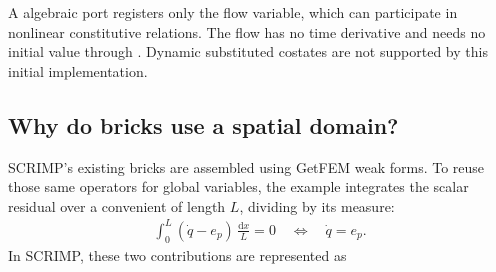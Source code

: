 \documentclass[letterpaper,10pt,english]{sphinxmanual}
\begin{document}
\begin{sphinxVerbatim}[commandchars=\\\{\}]
   
                     
\end{sphinxVerbatim}

\sphinxAtStartPar
A  algebraic port registers only the flow variable,
which can participate in nonlinear constitutive relations. The flow
has no time derivative and needs no initial value through
. Dynamic substituted co\sphinxhyphen{}states are not supported
by this initial implementation.


\subsection{Why do bricks use a spatial domain?}
\label{\detokenize{lumped:why-do-bricks-use-a-spatial-domain}}
\sphinxAtStartPar
SCRIMP’s existing bricks are assembled using GetFEM weak forms. To
reuse those same operators for global variables, the example integrates
the scalar residual over a convenient  of length
\(L\), dividing by its measure:
\begin{equation*}
\begin{split}\int_0^L (\dot q-e_p)\,\frac{\mathrm dx}{L}=0
\quad\Longleftrightarrow\quad
\dot q=e_p.\end{split}
\end{equation*}
\sphinxAtStartPar
In SCRIMP, these two contributions are represented as

\begin{sphinxVerbatim}[commandchars=\\\{\}]
  \PYG{p}{[}\PYG{p}{]}  
  \PYG{p}{[}\PYG{p}{]} 
\end{sphinxVerbatim}
\end{document}
